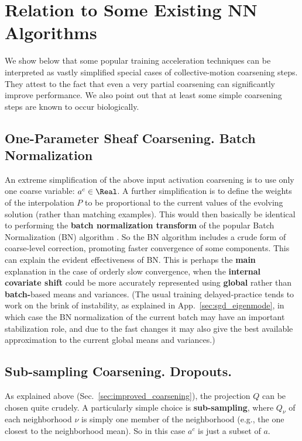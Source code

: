 \documentclass{article} %
\begin{document}
\section{Relation to Some Existing NN Algorithms}
\label{sec:relation_existing}
We show below that some popular training acceleration techniques can be interpreted as vastly simplified special cases of collective-motion coarsening steps. They attest to the fact that even a very partial coarsening can significantly improve performance. We also point out that at least some simple coarsening steps are known to occur biologically.

\subsection{One-Parameter Sheaf Coarsening. Batch Normalization}
An extreme simplification of the above input activation coarsening is to use only one coarse variable: $a^c \in \Real$. A further simplification is to define the weights of the interpolation $P$ to be proportional to the current values of the evolving solution (rather than matching examples). This would then basically be identical to performing the \textbf{batch normalization transform} of the popular Batch Normalization (BN) algorithm \cite{bn}. So the BN algorithm includes a crude form of coarse-level correction, promoting faster convergence of some components. This can explain the evident effectiveness of BN. This is perhaps the \textbf{main} explanation in the case of orderly slow convergence, when the \textbf{internal covariate shift} could be more accurately represented using \textbf{global} rather than \textbf{batch-}based means and variances. (The usual training delayed-practice tends to work on the brink of instability, as explained in App.~\ref{sec:sgd_eigenmode}, in which case the BN normalization of the current batch may have an important stabilization role, and due to the fast changes it may also give the best available approximation to the current global means and variances.)

\subsection{Sub-sampling Coarsening. Dropouts.}
As explained above (Sec.~\ref{sec:improved_coarsening}), the projection $Q$ can be chosen quite crudely. A particularly simple choice is \textbf{sub-sampling}, where $Q_{\nu}$ of each neighborhood $\nu$ is simply one member of the neighborhood (e.g., the one closest to the neighborhood mean). So in this case $a^c$ is just a subset of $a$.
\end{document}
